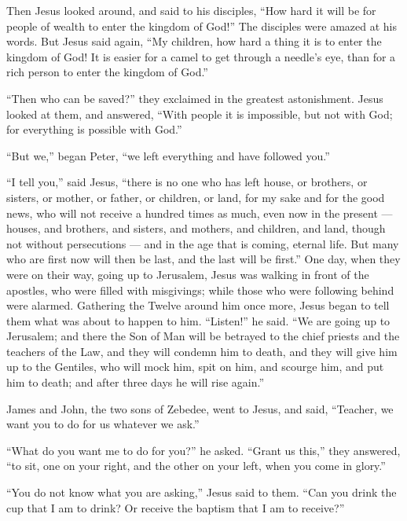  Then Jesus looked around, and said to his disciples, ``How
hard it will be for people of wealth to enter the kingdom of God!''
 The disciples were amazed at his words. But Jesus said
again, ``My children, how hard a thing it is to enter the kingdom of
God!  It is easier for a camel to get through a needle's
eye, than for a rich person to enter the kingdom of God.''

 ``Then who can be saved?'' they exclaimed in the greatest
astonishment.  Jesus looked at them, and answered, ``With
people it is impossible, but not with God; for everything is possible
with God.''

 ``But we,'' began Peter, ``we left everything and have
followed you.''

 ``I tell you,'' said Jesus, ``there is no one who has left
house, or brothers, or sisters, or mother, or father, or children, or
land, for my sake and for the good news,  who will not
receive a hundred times as much, even now in the present --- houses, and
brothers, and sisters, and mothers, and children, and land, though not
without persecutions --- and in the age that is coming, eternal life.
 But many who are first now will then be last, and the last
will be first.''  One day, when they were on their way,
going up to Jerusalem, Jesus was walking in front of the apostles, who
were filled with misgivings; while those who were following behind were
alarmed. Gathering the Twelve around him once more, Jesus began to tell
them what was about to happen to him.  ``Listen!'' he said.
``We are going up to Jerusalem; and there the Son of Man will be
betrayed to the chief priests and the teachers of the Law, and they will
condemn him to death, and they will give him up to the Gentiles,
 who will mock him, spit on him, and scourge him, and put
him to death; and after three days he will rise again.''

 James and John, the two sons of Zebedee, went to Jesus,
and said, ``Teacher, we want you to do for us whatever we ask.''

 ``What do you want me to do for you?'' he asked.
 ``Grant us this,'' they answered, ``to sit, one on your
right, and the other on your left, when you come in glory.''

 ``You do not know what you are asking,'' Jesus said to
them. ``Can you drink the cup that I am to drink? Or receive the baptism
that I am to receive?''

